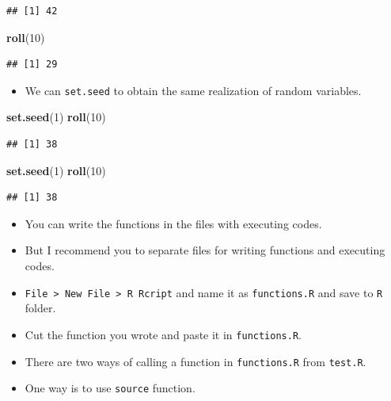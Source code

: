 \documentclass[]{book}
\newenvironment{Shaded}{\begin{snugshade}}{\end{snugshade}}
\newcommand{\KeywordTok}[1]{\textcolor[rgb]{0.13,0.29,0.53}{\textbf{#1}}}
\newcommand{\DecValTok}[1]{\textcolor[rgb]{0.00,0.00,0.81}{#1}}
\newcommand{\NormalTok}[1]{#1}
\providecommand{\tightlist}{%
  \setlength{\itemsep}{0pt}\setlength{\parskip}{0pt}}
\theoremstyle{definition}
\theoremstyle{definition}
\theoremstyle{definition}
\theoremstyle{remark}
\begin{document}
\begin{verbatim}
## [1] 42
\end{verbatim}

\begin{Shaded}
\begin{Highlighting}[]
\KeywordTok{roll}\NormalTok{(}\DecValTok{10}\NormalTok{)}
\end{Highlighting}
\end{Shaded}

\begin{verbatim}
## [1] 29
\end{verbatim}

\begin{itemize}
\tightlist
\item
  We can \texttt{set.seed} to obtain the same realization of random
  variables.
\end{itemize}

\begin{Shaded}
\begin{Highlighting}[]
\KeywordTok{set.seed}\NormalTok{(}\DecValTok{1}\NormalTok{)}
\KeywordTok{roll}\NormalTok{(}\DecValTok{10}\NormalTok{)}
\end{Highlighting}
\end{Shaded}

\begin{verbatim}
## [1] 38
\end{verbatim}

\begin{Shaded}
\begin{Highlighting}[]
\KeywordTok{set.seed}\NormalTok{(}\DecValTok{1}\NormalTok{)}
\KeywordTok{roll}\NormalTok{(}\DecValTok{10}\NormalTok{)}
\end{Highlighting}
\end{Shaded}

\begin{verbatim}
## [1] 38
\end{verbatim}

\begin{itemize}
\tightlist
\item
  You can write the functions in the files with executing codes.
\item
  But I recommend you to separate files for writing functions and
  executing codes.
\item
  \texttt{File\ \textgreater{}\ New\ File\ \textgreater{}\ R\ Rcript}
  and name it as \texttt{functions.R} and save to \texttt{R} folder.
\item
  Cut the function you wrote and paste it in \texttt{functions.R}.
\item
  There are two ways of calling a function in \texttt{functions.R} from
  \texttt{test.R}.
\item
  One way is to use \texttt{source} function.
\end{itemize}
\end{document}
